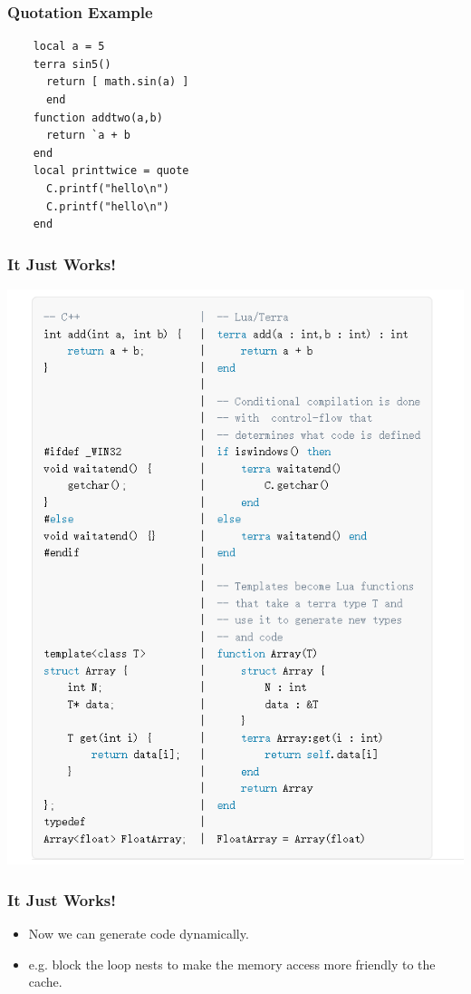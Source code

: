 \documentclass{beamer}
\begin{document}
\begin{frame}[fragile]
  \frametitle{Quotation Example}
  \begin{lstlisting}
    local a = 5
    terra sin5()
      return [ math.sin(a) ]
      end
    function addtwo(a,b)
      return `a + b
    end
    local printtwice = quote
      C.printf("hello\n")
      C.printf("hello\n")
    end
  \end{lstlisting}
\end{frame}

\begin{frame}
	\frametitle{It Just Works!}
  \includegraphics[scale=0.45]{terra2.png}
\end{frame}

\begin{frame}
	\frametitle{It Just Works!}
  \begin{itemize}
  \item Now we can generate code dynamically.\pause
  \item e.g. block the loop nests to make the memory access more friendly to the cache.
  \end{itemize}
\end{frame}
\end{document}

